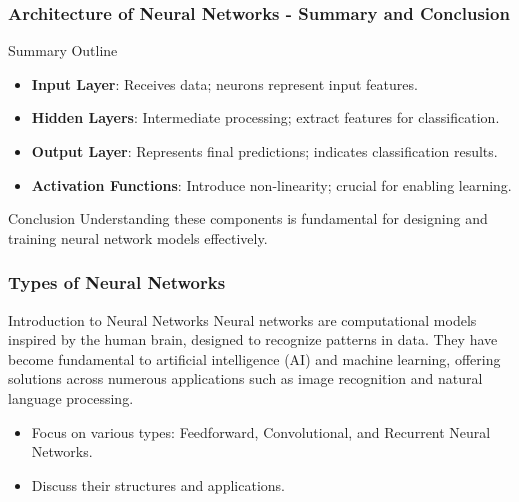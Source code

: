 \documentclass[aspectratio=169]{beamer}
\begin{document}
\begin{frame}[fragile]
    \frametitle{Architecture of Neural Networks - Summary and Conclusion}
    \begin{block}{Summary Outline}
        \begin{itemize}
            \item \textbf{Input Layer}: Receives data; neurons represent input features.
            \item \textbf{Hidden Layers}: Intermediate processing; extract features for classification.
            \item \textbf{Output Layer}: Represents final predictions; indicates classification results.
            \item \textbf{Activation Functions}: Introduce non-linearity; crucial for enabling learning.
        \end{itemize}
    \end{block}
    \begin{block}{Conclusion}
        Understanding these components is fundamental for designing and training neural network models effectively. 
    \end{block}
\end{frame}

\begin{frame}[fragile]
    \frametitle{Types of Neural Networks}
    
    \begin{block}{Introduction to Neural Networks}
        Neural networks are computational models inspired by the human brain, designed to recognize patterns in data. They have become fundamental to artificial intelligence (AI) and machine learning, offering solutions across numerous applications such as image recognition and natural language processing.
    \end{block}
    
    \begin{itemize}
        \item Focus on various types: Feedforward, Convolutional, and Recurrent Neural Networks.
        \item Discuss their structures and applications.
    \end{itemize}
    
\end{frame}
\end{document}
